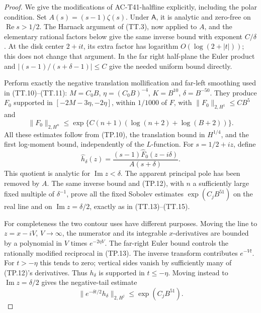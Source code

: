 \begin{proof}
We give the modifications of AC-T41-halfline explicitly,
including the polar condition.  Set
\(A(s)=(s-1)\zeta(s)\).
Under \(\mathsf A\), it is analytic and zero-free on
\(\operatorname{Re}s>1/2\).
The Harnack argument of (TT.3), now applied to \(A\),
and the elementary rational factors below give the
same inverse bound with exponent \(C/\delta\).
At the disk center \(2+it\), its extra factor has
logarithm \(O(\log(2+|t|))\); this does not change
that argument.  In the far right half-plane the
Euler product and \(|(s-1)/(s+\delta-1)|\leq C\)
give the needed uniform bound directly.

Perform exactly the negative translation mollification
and far-left smoothing used in (TT.10)--(TT.11):
\(M=C_0B\), \(\eta=(C_0B)^{-4}\),
\(K=B^{10}\), \(\delta=B^{-50}\).
They produce \(F_0\) supported in
\([-2M-3\eta,-2\eta]\), within \(1/1000\) of \(F\),
with \(\|F_0\|_{2,H^1}\leq CB^5\) and
\[
 \|F_0\|_{2,H^n}
  \leq\exp\{C(n+1)(\log(n+2)+\log(B+2))\}.
 \tag{TP.12}
\]
All these estimates follow from (TP.10), the
translation bound in \(H^{1/4}\), and the first
log-moment bound, independently of the \(L\)-function.
For \(s=1/2+iz\), define
\[
 \widehat h_\delta(z)
       =\frac{(s-1)\widehat F_0(z-i\delta)}
                          {A(s+\delta)}.
 \tag{TP.13}
\]
This quotient is analytic for \(\operatorname{Im}z<\delta\).
The apparent principal pole has been removed by \(A\).
The same inverse bound and (TP.12), with
\(n\) a sufficiently large fixed multiple of
\(\delta^{-1}\), prove all the fixed Sobolev estimates
\(\exp(C_jB^{51})\) on the real line and on
\(\operatorname{Im}z=\delta/2\), exactly as in
(TT.13)--(TT.15).

For completeness the two contour uses have different
purposes.  Moving the line to \(z=x-iV\), \(V\to\infty\),
the numerator and its integrable \(x\)-derivatives are
bounded by a polynomial in \(V\) times \(e^{-2\eta V}\).
The far-right Euler bound controls the rationally
modified reciprocal in (TP.13).
The inverse transform contributes \(e^{-Vt}\).
For \(t>-\eta\) this tends to zero; vertical sides
vanish by sufficiently many of (TP.12)'s derivatives.
Thus \(h_\delta\) is supported in \(t\leq-\eta\).
Moving instead to \(\operatorname{Im}z=\delta/2\)
gives the negative-tail estimate
\[
 \|e^{-\delta t/2}h_\delta\|_{2,H^j}
                          \leq\exp(C_jB^{51}).
 \tag{TP.14}
\]


\end{proof}
